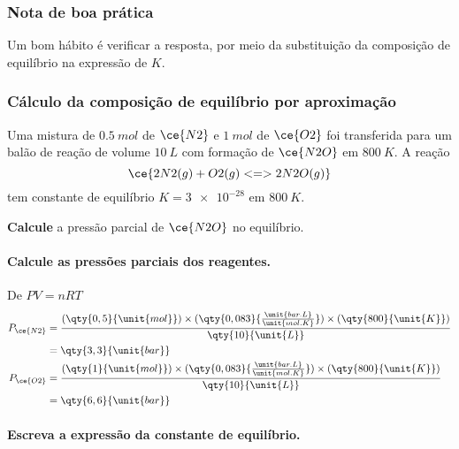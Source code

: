 \begin{info}

\subsubsection{Nota de boa prática}

Um bom hábito é verificar a resposta, por meio da substituição da composição de equilíbrio na expressão de \(K\).

\end{info}

\begin{example}

\subsubsection{Cálculo da composição de equilíbrio por aproximação}

Uma mistura de \(\qty{0,5}{\unit{mol}}\) de \(\ce{N2}\) e \(\qty{1}{\unit{mol}}\) de \(\ce{O2}\) foi transferida para um balão de reação de volume
\(\qty{10}{\unit{L}}\) com formação de \(\ce{N2O}\) em \(\qty{800}{\unit{K}}\). A reação \[
    \ce{ 2 N2(g) + O2(g) <=> 2 N2O(g) }
\] tem constante de equilíbrio \(K = \num{3e-28}\) em \(\qty{800}{\unit{K}}\).

\textbf{Calcule} a pressão parcial de \(\ce{N2O}\) no equilíbrio.

\paragraph{Calcule as pressões parciais dos reagentes.}

De \(PV = nRT\) \[
\begin{aligned}
    P_{\ce{N2}} &= 
        \dfrac{ (\qty{0,5}{\unit{mol}}) \times (\qty{0,083}{\tfrac{\unit{bar.L}}{\unit{mol.K}}}) \times (\qty{800}{\unit{K}}) }{ \qty{10}{\unit{L}} } \\
    &= \qty{3,3}{\unit{bar}} \\
    P_{\ce{O2}} &= 
        \dfrac{ (\qty{1}{\unit{mol}}) \times (\qty{0,083}{\tfrac{\unit{bar.L}}{\unit{mol.K}}}) \times (\qty{800}{\unit{K}}) }{ \qty{10}{\unit{L}} } \\
    &= \qty{6,6}{\unit{bar}}
\end{aligned}
\]

\paragraph{Escreva a expressão da constante de equilíbrio.}


\end{example}
